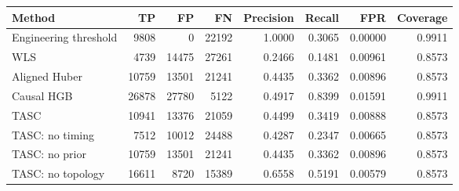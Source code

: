 \begin{tabular}{lrrrrrrr}\toprule
Method & TP & FP & FN & Precision & Recall & FPR & Coverage \\
\midrule
Engineering threshold & 9808 & 0 & 22192 & 1.0000 & 0.3065 & 0.00000 & 0.9911 \\
WLS & 4739 & 14475 & 27261 & 0.2466 & 0.1481 & 0.00961 & 0.8573 \\
Aligned Huber & 10759 & 13501 & 21241 & 0.4435 & 0.3362 & 0.00896 & 0.8573 \\
Causal HGB & 26878 & 27780 & 5122 & 0.4917 & 0.8399 & 0.01591 & 0.9911 \\
TASC & 10941 & 13376 & 21059 & 0.4499 & 0.3419 & 0.00888 & 0.8573 \\
TASC: no timing & 7512 & 10012 & 24488 & 0.4287 & 0.2347 & 0.00665 & 0.8573 \\
TASC: no prior & 10759 & 13501 & 21241 & 0.4435 & 0.3362 & 0.00896 & 0.8573 \\
TASC: no topology & 16611 & 8720 & 15389 & 0.6558 & 0.5191 & 0.00579 & 0.8573 \\
\bottomrule\end{tabular}
